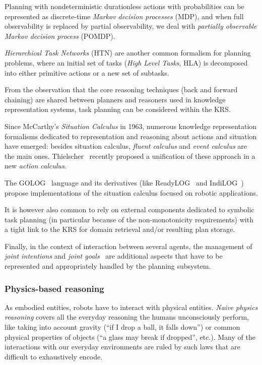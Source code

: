 Planning with nondeterministic durationless actions with probabilities can be
represented as discrete-time \emph{Markov decision processes} (MDP), and when
full observability is replaced by partial observability, we deal with
\emph{partially observable Markov decision process} (POMDP).

\emph{Hierarchical Task Networks} (HTN) are another common formalism for
planning problems, where an initial set of tasks (\emph{High Level Tasks}, HLA)
is decomposed into either primitive actions or a new set of subtasks.

From the observation that the core reasoning techniques (back and forward
chaining) are shared between planners and reasoners used in knowledge
representation systems, task planning can be considered within the KRS.

Since McCarthy's \emph{Situation Calculus} in 1963, numerous knowledge
representation formalisms dedicated to representation and reasoning about
actions and situation have emerged: besides situation calculus, \emph{fluent
calculus} and \emph{event calculus} are the main ones.
Thielscher~\cite{Thielscher2011} recently proposed a unification of these
approach in a new \emph{action calculus}.

The GOLOG~\cite{Levesque1997} language and its derivatives (like {\sc
ReadyLOG}~\cite{Ferrein2008} and {\sc IndiLOG}~\cite{Gspandl2011}) propose
implementations of the situation calculus focused on robotic applications.


It is however also common to rely on external components dedicated to symbolic task
planning (in particular because of the non-monotonicity requirements) with a
tight link to the KRS for domain retrieval and/or resulting plan storage.

Finally, in the context of interaction between several agents, the management
of \emph{joint intentions} and \emph{joint goals}~\cite{Tomasello2005,
Dominey2011} are additional aspects that have to be represented and
appropriately handled by the planning subsystem.


\subsubsection{Physics-based reasoning}
\label{sect|physics}

As embodied entities, robots have to interact with physical entities.
\emph{Naive physics reasoning} covers all the everyday reasoning the humans
unconsciously perform, like taking into account gravity (``if I drop a ball, it
falls down'') or common physical properties of objects (``a glass may break if
dropped'', etc.). Many of the interactions with our everyday environments are
ruled by such laws that are difficult to exhaustively encode.

